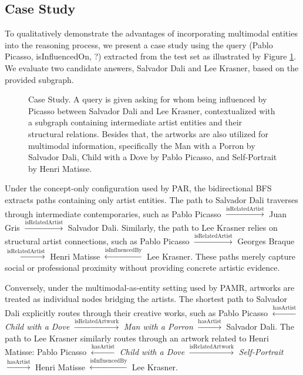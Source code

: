 \documentclass[runningheads]{llncs}
\begin{document}
\subsection{Case Study}
\label{sec:case-study}

To qualitatively demonstrate the advantages of incorporating multimodal entities into the reasoning process, we present a case study using the query (Pablo Picasso, isInfluencedOn, ?) extracted from the test set as illustrated by Figure \ref{fig:case-study}. We evaluate two candidate answers, Salvador Dali and Lee Krasner, based on the provided subgraph.

\begin{figure}[t]
  \centering
  
  \caption{Case Study. A query is given asking for whom being influenced by Picasso between Salvador Dali and Lee Krasner, contextualized with a subgraph containing intermediate artist entities and their structural relations. Besides that, the artworks are also utilized for multimodal information, specifically the Man with a Porron by Salvador Dali, Child with a Dove by Pablo Picasso, and Self-Portrait by Henri Matisse.}
  \label{fig:case-study}
\end{figure}

Under the concept-only configuration used by PAR, the bidirectional BFS extracts paths containing only artist entities. The path to Salvador Dali traverses through intermediate contemporaries, such as Pablo Picasso $\xrightarrow{\text{isRelatedArtist}}$ Juan Gris $\xrightarrow{\text{isRelatedArtist}}$ Salvador Dali. Similarly, the path to Lee Krasner relies on structural artist connections, such as Pablo Picasso $\xrightarrow{\text{isRelatedArtist}}$ Georges Braque $\xrightarrow{\text{isRelatedArtist}}$ Henri Matisse $\xleftarrow{\text{isInfluencedBy}}$ Lee Krasner. These paths merely capture social or professional proximity without providing concrete artistic evidence.

Conversely, under the multimodal-as-entity setting used by PAMR, artworks are treated as individual nodes bridging the artists. The shortest path to Salvador Dali explicitly routes through their creative works, such as Pablo Picasso $\xleftarrow{\text{hasArtist}}$ \textit{Child with a Dove} $\xrightarrow{\text{isRelatedArtwork}}$ \textit{Man with a Porron} $\xrightarrow{\text{hasArtist}}$ Salvador Dali. The path to Lee Krasner similarly routes through an artwork related to Henri Matisse: Pablo Picasso $\xleftarrow{\text{hasArtist}}$ \textit{Child with a Dove} $\xrightarrow{\text{isRelatedArtwork}}$ \textit{Self-Portrait} $\xrightarrow{\text{hasArtist}}$ Henri Matisse $\xleftarrow{\text{isInfluencedBy}}$ Lee Krasner.
\end{document}
